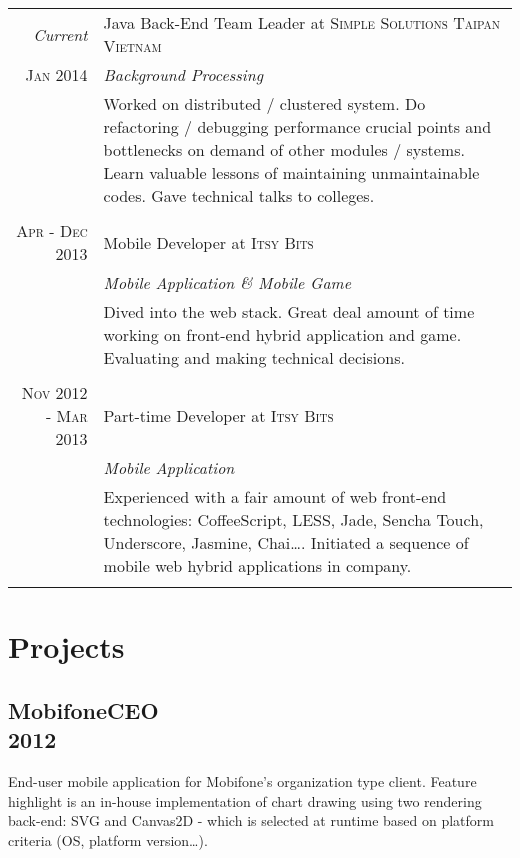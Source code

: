 \documentclass[a4paper,10pt]{article}
\begin{document}
\begin{tabular}{r|p{11cm}}

    \emph{Current} & Java Back-End Team Leader at \textsc{Simple Solutions Taipan Vietnam} \\\textsc{Jan 2014}&\emph{Background Processing}\\&\footnotesize{Worked on distributed / clustered system. Do refactoring / debugging performance crucial points and bottlenecks on demand of other modules / systems. Learn valuable lessons of maintaining unmaintainable codes. Gave technical talks to colleges.}\\\multicolumn{2}{c}{} \\

    \textsc{Apr - Dec 2013 } & Mobile Developer at \textsc{Itsy Bits} \\&\emph{Mobile Application \& Mobile Game}\\&\footnotesize{Dived into the web stack. Great deal amount of time working on front-end hybrid application and game. Evaluating and making technical decisions.}\\\multicolumn{2}{c}{} \\

    \textsc{Nov 2012 - Mar 2013} & Part-time Developer at \textsc{Itsy Bits} \\&\emph{Mobile Application}\\&\footnotesize{Experienced with a fair amount of web front-end technologies: CoffeeScript, LESS, Jade, Sencha Touch, Underscore, Jasmine, Chai\ldots. Initiated a sequence of mobile web hybrid applications in company.}\\\multicolumn{2}{c}{} \\

\end{tabular}

\section{Projects}


\subsection*{MobifoneCEO\\\small 2012}

End-user mobile application for Mobifone's organization type client. Feature highlight is an in-house implementation of chart drawing using two rendering back-end: SVG and Canvas2D - which is selected at runtime based on platform criteria (OS, platform version\ldots).
\end{document}
